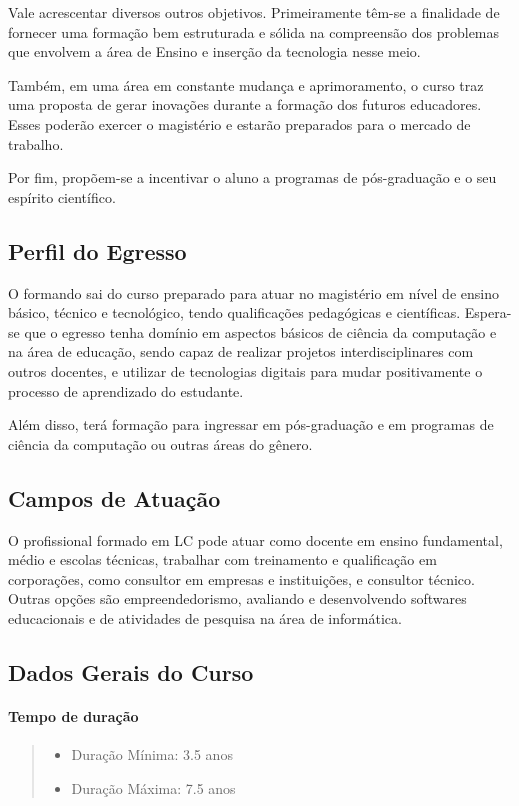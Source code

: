 Vale acrescentar diversos outros objetivos. Primeiramente têm-se a finalidade de fornecer uma formação bem estruturada e sólida na compreensão dos problemas que envolvem a área de Ensino e inserção da tecnologia nesse meio.

Também, em uma área em constante mudança e aprimoramento, o curso traz uma proposta de gerar inovações durante a formação dos futuros educadores. Esses poderão exercer o magistério e estarão preparados para o mercado de trabalho.

Por fim, propõem-se a incentivar o aluno a programas de pós-graduação e o seu espírito científico.

\subsection{Perfil do Egresso}

O formando sai do curso preparado para atuar no magistério em nível de ensino básico, técnico e tecnológico, tendo qualificações pedagógicas e científicas. Espera-se que o egresso tenha domínio em aspectos básicos de ciência da computação e na área de educação, sendo capaz de realizar projetos interdisciplinares com outros docentes, e utilizar de tecnologias digitais para mudar positivamente o processo de aprendizado do estudante. 

Além disso, terá formação para ingressar em pós-graduação e em programas de ciência da computação ou outras áreas do gênero.

\subsection{Campos de Atuação}

O profissional formado em LC pode atuar como docente em ensino fundamental, médio e escolas técnicas, trabalhar com treinamento e qualificação em corporações, como consultor em empresas e instituições, e consultor técnico. Outras opções são empreendedorismo, avaliando e desenvolvendo softwares educacionais e de atividades de pesquisa na área de informática.

\subsection{Dados Gerais do Curso}
    \paragraph{Tempo de duração}
    \begin{quote}
	    \begin{itemize}
		    \item{Duração Mínima: 3.5 anos}
            \item{Duração Máxima: 7.5 anos}
	    \end{itemize}  
    \end{quote}


